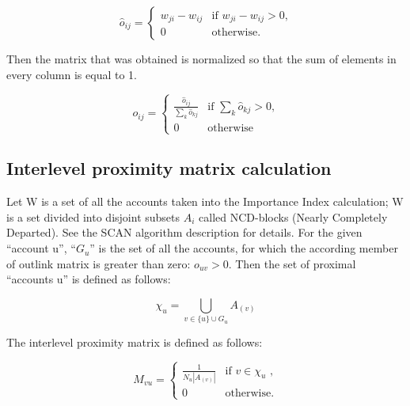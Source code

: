 \documentclass[a4paper,12pt]{article}
\begin{document}
$$
\hat{o}_{ij} = \begin{cases}
 w_{ji}-w_{ij}
 & \text{if $w_{ji}-w_{ij} > 0$,}\\
 0 & \text{otherwise.}
\end{cases}
$$

Then the matrix that was obtained  is normalized so that the sum of elements in every column is equal to 1.


$$
o_{ij} = \begin{cases}
 \frac{\hat{o}_{ij}} {\sum\limits_{k} \hat{o}_{kj}}
 & \text{if $\sum\limits_{k} \hat{o}_{kj}> 0$,}\\
 0 & \text{otherwise}
\end{cases} 
$$

\subsection{Interlevel proximity matrix calculation}

Let W is a set of all the accounts taken into the Importance Index calculation; W is a set divided into disjoint subsets $A_i$ called NCD-blocks (Nearly Completely Departed). See the SCAN algorithm description for details. For the given “account u”, “$G_u$” is the set of all the accounts, for which the according member of outlink matrix is greater than zero: $o_{uv} > 0$. Then the set of proximal “accounts u” is defined as follows: 



$$
\chi_u = \bigcup_{v \in \{u\} \cup G_u} A_{(v)}
$$

The interlevel proximity matrix is defined as follows:


$$
M_{vu}=\begin{cases}
 \frac{1}{N_u |A_{(v)}|}
 & \text{if $v \in \chi_u$ ,}\\
 0 & \text{otherwise.}
\end{cases}
$$
\end{document}
